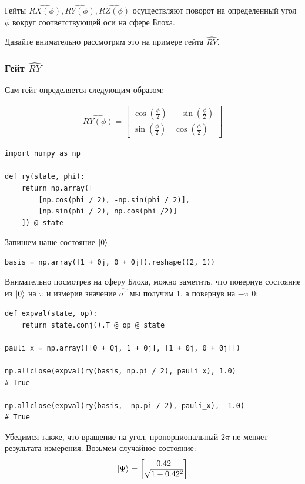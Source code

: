 \documentclass[11pt]{article}
\begin{document}
Гейты \(\hat{RX(\phi)}, \hat{RY(\phi)}, \hat{RZ(\phi)}\) осуществляют поворот на определенный угол \(\phi\) вокруг соответствующей оси на сфере Блоха.


Давайте внимательно рассмотрим это на примере гейта \(\hat{RY}\).



\subsubsection{Гейт \(\hat{RY}\)}
\label{sec:org37c5302}
Сам гейт определяется следующим образом:

\begin{align*}
\hat{RY(\phi)} = \begin{bmatrix}
\cos(\frac{\phi}{2}) & -\sin(\frac{\phi}{2}) \\
\sin(\frac{\phi}{2}) & \cos(\frac{\phi}{2})
\end{bmatrix}
\end{align*}

\begin{verbatim}
import numpy as np

def ry(state, phi):
    return np.array([
        [np.cos(phi / 2), -np.sin(phi / 2)],
        [np.sin(phi / 2), np.cos(phi /2)]
    ]) @ state
\end{verbatim}

Запишем наше состояние \(\ket{0}\)

\begin{verbatim}
basis = np.array([1 + 0j, 0 + 0j]).reshape((2, 1))
\end{verbatim}

Внимательно посмотрев на сферу Блоха, можно заметить, что повернув состояние из \(\ket{0}\) на \(\pi\) и измерив значение \(\hat{\sigma^z}\) мы получим 1, а повернув на \(-\pi\) 0:
\begin{verbatim}
def expval(state, op):
    return state.conj().T @ op @ state

pauli_x = np.array([[0 + 0j, 1 + 0j], [1 + 0j, 0 + 0j]])

np.allclose(expval(ry(basis, np.pi / 2), pauli_x), 1.0)
# True

np.allclose(expval(ry(basis, -np.pi / 2), pauli_x), -1.0)
# True
\end{verbatim}

Убедимся также, что вращение на угол, пропорциональный \(2\pi\) не меняет результата измерения. Возьмем случайное состояние:
\begin{align*}
\ket{\Psi} = \begin{bmatrix}
0.42 \\
\sqrt{1 - 0.42^2}
\end{bmatrix}
\end{align*}
\end{document}

